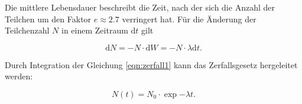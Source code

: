 Die mittlere Lebensdauer beschreibt die Zeit, nach der sich die Anzahl der Teilchen um
den Faktor $e \approx 2.7$ verringert hat.
Für die Änderung der Teilchenzahl $N$ in einem Zeitraum $\text{d}t$ gilt

\begin{equation}
  \text{d}N = - N \cdot \text{d}W = - N \cdot \lambda \text{d}t.
  \label{eqn:zerfall1}
\end{equation}

Durch Integration der Gleichung \ref{eqn:zerfall1} kann das Zerfallsgesetz hergeleitet werden:

\begin{equation}
  N(t) = N_{0} \cdot \exp{- \lambda t}.
  \label{eqn:zerfallsgesetz}
\end{equation}
